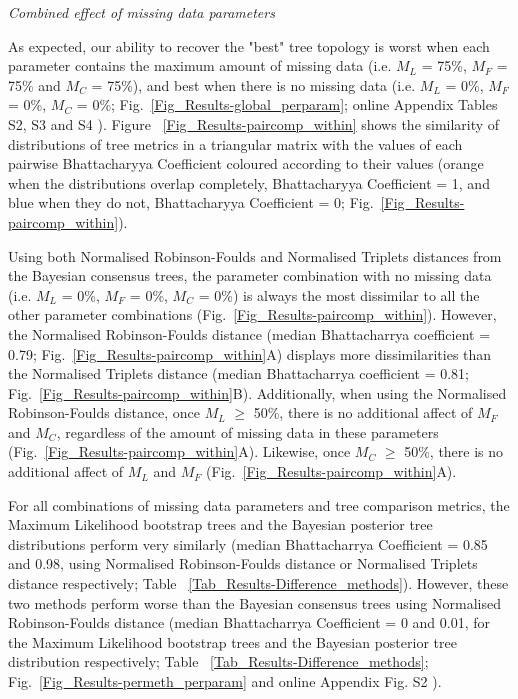 \documentclass[12pt,letterpaper]{article}
\renewcommand{\subsection}[1]{%
\bigskip
\begin{center}
\begin{large}
\normalfont\itshape #1
\end{large}
\end{center}}
\begin{document}
\subsection{Combined effect of missing data parameters}
As expected, our ability to recover the "best" tree topology is worst when each parameter contains the maximum amount of missing data (i.e. $M_{L}$ = 75\%, $M_{F}$ = 75\% and $M_{C}$ = 75\%), and best when there is no missing data (i.e. $M_{L}$ = 0\%, $M_{F}$ = 0\%, $M_{C}$ = 0\%; Fig.~\ref{Fig_Results-global_perparam}; online Appendix Tables %
S2, S3 and S4 %
). Figure ~\ref{Fig_Results-paircomp_within} shows the similarity of distributions of tree metrics in a triangular matrix with the values of each pairwise Bhattacharyya Coefficient coloured according to their values (orange when the distributions overlap completely, Bhattacharyya Coefficient = 1, and blue when they do not, Bhattacharyya Coefficient = 0; Fig.~\ref{Fig_Results-paircomp_within}). 

Using both Normalised Robinson-Foulds and Normalised Triplets distances from the Bayesian consensus trees, the parameter combination with no missing data (i.e. $M_{L}$ = 0\%, $M_{F}$ = 0\%, $M_{C}$ = 0\%) is always the most dissimilar to all the other parameter combinations (Fig.~\ref{Fig_Results-paircomp_within}). However, the Normalised Robinson-Foulds distance (median Bhattacharrya coefficient = 0.79; Fig.~\ref{Fig_Results-paircomp_within}A) displays more dissimilarities than the Normalised Triplets distance (median Bhattacharrya coefficient = 0.81; Fig.~\ref{Fig_Results-paircomp_within}B). Additionally, when using the Normalised Robinson-Foulds distance, once $M_{L}$ $\geq$ 50\%, there is no additional affect of $M_{F}$ and $M_{C}$, regardless of the amount of missing data in these parameters (Fig.~\ref{Fig_Results-paircomp_within}A). Likewise, once $M_{C}$ $\geq$ 50\%, there is no additional affect of $M_{L}$ and $M_{F}$ (Fig.~\ref{Fig_Results-paircomp_within}A).

For all combinations of missing data parameters and tree comparison metrics, the Maximum Likelihood bootstrap trees and the Bayesian posterior tree distributions perform very similarly (median Bhattacharrya Coefficient = 0.85 and 0.98, using Normalised Robinson-Foulds distance or Normalised Triplets distance respectively; Table ~\ref{Tab_Results-Difference_methods}). However, these two methods perform worse than the Bayesian consensus trees using Normalised Robinson-Foulds distance (median Bhattacharrya Coefficient = 0 and 0.01, for the Maximum Likelihood bootstrap trees and the Bayesian posterior tree distribution respectively; Table ~\ref{Tab_Results-Difference_methods}; Fig.~\ref{Fig_Results-permeth_perparam} and online Appendix Fig.%
S2 %
).
\end{document}
